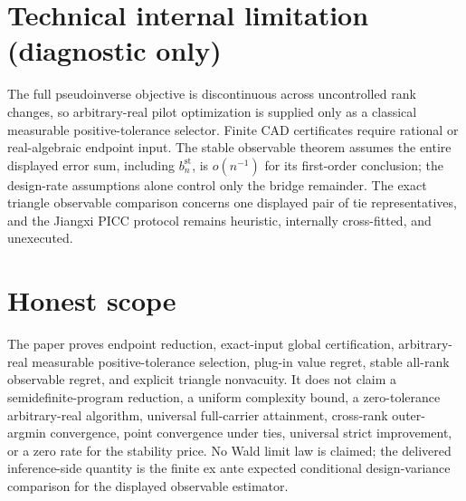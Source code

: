 \documentclass{article}
\begin{document}
\section*{Technical internal limitation (diagnostic only)}

The full pseudoinverse objective is discontinuous across uncontrolled rank changes, so arbitrary-real pilot optimization is supplied only as a classical measurable positive-tolerance selector.  Finite CAD certificates require rational or real-algebraic endpoint input.  The stable observable theorem assumes the entire displayed error sum, including \(b_n^{\mathrm{st}}\), is \(o(n^{-1})\) for its first-order conclusion; the design-rate assumptions alone control only the bridge remainder.  The exact triangle observable comparison concerns one displayed pair of tie representatives, and the Jiangxi PICC protocol remains heuristic, internally cross-fitted, and unexecuted.

\section{Honest scope}

The paper proves endpoint reduction, exact-input global certification, arbitrary-real measurable positive-tolerance selection, plug-in value regret, stable all-rank observable regret, and explicit triangle nonvacuity.  It does not claim a semidefinite-program reduction, a uniform complexity bound, a zero-tolerance arbitrary-real algorithm, universal full-carrier attainment, cross-rank outer-argmin convergence, point convergence under ties, universal strict improvement, or a zero rate for the stability price.  No Wald limit law is claimed; the delivered inference-side quantity is the finite ex ante expected conditional design-variance comparison for the displayed observable estimator.
\end{document}
